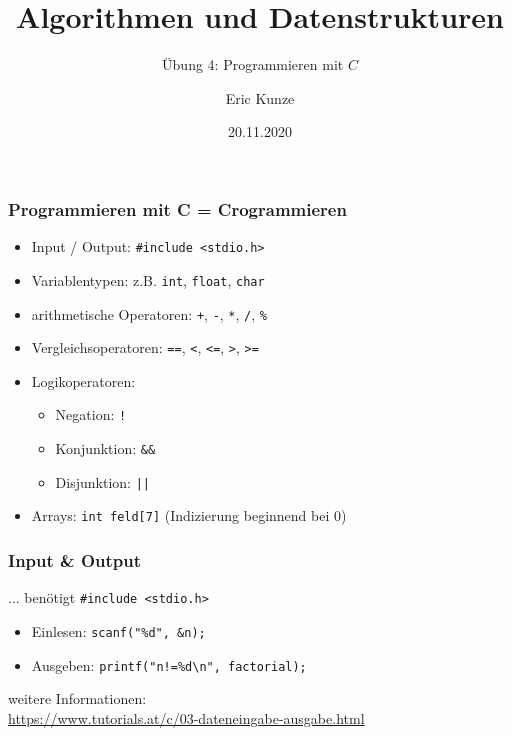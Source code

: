 \documentclass{beamer}
\begin{document}
	
	\title{Algorithmen und Datenstrukturen}
	\subtitle{Übung 4: Programmieren mit $C$}
	\author{Eric Kunze}
	\date{20.11.2020}

	\maketitle



\begin{frame}[fragile] \frametitle{Programmieren mit C = Crogrammieren}
	\begin{itemize}
		\item Input / Output: \lstinline{#include <stdio.h>}
		\item Variablentypen: z.B. \lstinline{int}, \lstinline{float}, \lstinline{char}
		\item arithmetische Operatoren: \lstinline{+}, \lstinline{-},  \lstinline{*}, \lstinline{/}, \lstinline{%}
		\item Vergleichsoperatoren: \lstinline{==}, \lstinline{<}, \lstinline{<=}, \lstinline{>}, \lstinline{>=}
		\item Logikoperatoren: 
		\begin{itemize}
			\item Negation: \lstinline{!} 
			\item Konjunktion: \lstinline{&&} 
			\item Disjunktion: \lstinline{||}
		\end{itemize}
		\item Arrays: \lstinline{int feld[7]} (Indizierung beginnend bei 0)
	\end{itemize}
\end{frame}

\begin{frame}[fragile] \frametitle{Input \& Output}
	... benötigt \lstinline|#include <stdio.h>|
	\begin{itemize}
		\item Einlesen: \lstinline{scanf("%d", &n);}
		\item Ausgeben: \lstinline{printf("n!=%d\n", factorial);}
	\end{itemize}

	weitere Informationen: \\
	\url{https://www.tutorials.at/c/03-dateneingabe-ausgabe.html}
			
			
\end{frame}
\end{document}
